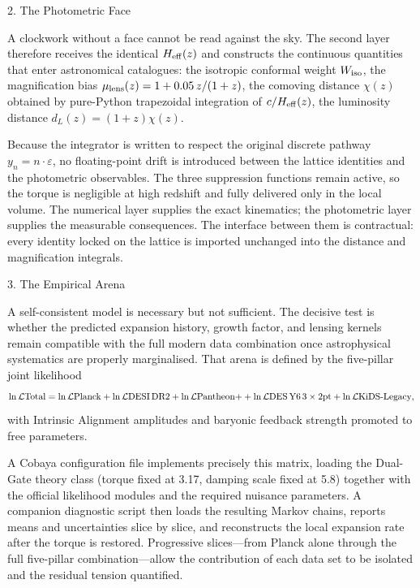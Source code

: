 2. The Photometric Face

A clockwork without a face cannot be read against the sky. The second layer therefore receives the identical \(H_{\rm eff}(z)\) and constructs the continuous quantities that enter astronomical catalogues:  
the isotropic conformal weight \(W_{\rm iso}\),  
the magnification bias \(\mu_{\rm lens}(z) = 1 + 0.05\,z/(1+z)\),  
the comoving distance \(\chi(z)\) obtained by pure-Python trapezoidal integration of \(c/H_{\rm eff}(z)\),  
the luminosity distance \(d_L(z) = (1+z)\chi(z)\).

Because the integrator is written to respect the original discrete pathway \(y_n = n\cdot\varepsilon\), no floating-point drift is introduced between the lattice identities and the photometric observables. The three suppression functions remain active, so the torque is negligible at high redshift and fully delivered only in the local volume. The numerical layer supplies the exact kinematics; the photometric layer supplies the measurable consequences. The interface between them is contractual: every identity locked on the lattice is imported unchanged into the distance and magnification integrals.

3. The Empirical Arena

A self-consistent model is necessary but not sufficient. The decisive test is whether the predicted expansion history, growth factor, and lensing kernels remain compatible with the full modern data combination once astrophysical systematics are properly marginalised. That arena is defined by the five-pillar joint likelihood  
\[
\ln\mathcal{L}{\rm Total} = \ln\mathcal{L}{\rm Planck} + \ln\mathcal{L}{\rm DESI\,DR2} + \ln\mathcal{L}{\rm Pantheon+} + \ln\mathcal{L}{\rm DES\,Y6\,3\times2pt} + \ln\mathcal{L}{\rm KiDS\text{-}Legacy},
\]
with Intrinsic Alignment amplitudes and baryonic feedback strength promoted to free parameters.  

A Cobaya configuration file implements precisely this matrix, loading the Dual-Gate theory class (torque fixed at 3.17, damping scale fixed at 5.8) together with the official likelihood modules and the required nuisance parameters. A companion diagnostic script then loads the resulting Markov chains, reports means and uncertainties slice by slice, and reconstructs the local expansion rate after the torque is restored. Progressive slices—from Planck alone through the full five-pillar combination—allow the contribution of each data set to be isolated and the residual tension quantified.

